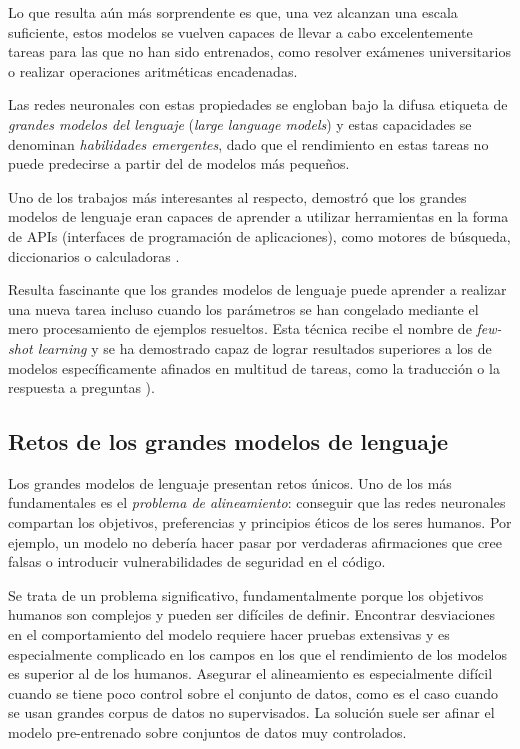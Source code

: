 Lo que resulta aún más sorprendente es que, una vez alcanzan una escala suficiente, estos modelos se vuelven capaces de llevar a cabo excelentemente tareas para las que no han sido entrenados, como resolver exámenes universitarios o realizar operaciones aritméticas encadenadas. 

Las redes neuronales con estas propiedades se engloban bajo la difusa etiqueta de \textit\textit{grandes modelos del lenguaje} (\textit{large language models}) y estas capacidades se denominan \textit{habilidades emergentes}, dado que el rendimiento en estas tareas no puede predecirse a partir del de modelos más pequeños.

Uno de los trabajos más interesantes al respecto, demostró que los grandes modelos de lenguaje eran capaces de aprender a utilizar herramientas en la forma de APIs (interfaces de programación de aplicaciones), como motores de búsqueda, diccionarios o calculadoras \cite{schick2023toolformer}.

Resulta fascinante que los grandes modelos de lenguaje puede aprender a realizar una nueva tarea incluso cuando los parámetros se han congelado mediante el mero procesamiento de ejemplos resueltos. Esta técnica recibe el nombre de \textit{few-shot learning} y se ha demostrado capaz de lograr resultados superiores a los de modelos específicamente afinados en multitud de tareas, como la traducción o la respuesta a preguntas \cite{brown2020language}).

\subsection{Retos de los grandes modelos de lenguaje}
Los grandes modelos de lenguaje presentan retos únicos. Uno de los más fundamentales es el \textit{problema de alineamiento}: conseguir que las redes neuronales compartan los objetivos, preferencias y principios éticos de los seres humanos. Por ejemplo, un modelo no debería hacer pasar por verdaderas afirmaciones que cree falsas o introducir vulnerabilidades de seguridad en el código.

Se trata de un problema significativo, fundamentalmente porque los objetivos humanos son complejos y pueden ser difíciles de definir. Encontrar desviaciones en el comportamiento del modelo requiere hacer pruebas extensivas y es especialmente complicado en los campos en los que el rendimiento de los modelos es superior al de los humanos. Asegurar el alineamiento es especialmente difícil cuando se tiene poco control sobre el conjunto de datos, como es el caso cuando se usan grandes corpus de datos no supervisados. La solución suele ser afinar el modelo pre-entrenado sobre conjuntos de datos muy controlados.

